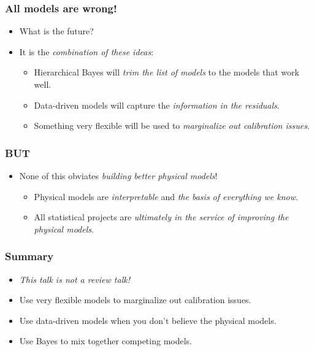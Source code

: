\documentclass[pdftex]{beamer}
\newcommand{\conclusions}{%
\begin{frame}
  \frametitle{Summary}
  \begin{itemize}
  \item \textit{This talk is not a review talk!}
  \item Use very flexible models to marginalize out calibration issues.
  \item Use data-driven models when you don't believe the physical models.
  \item Use Bayes to mix together competing models.
  \end{itemize}
\end{frame}}
\begin{document}
\begin{frame}
  \frametitle{All models are wrong!}
  \begin{itemize}
  \item What is the future?
  \item It is the \emph{combination of these ideas}:
    \begin{itemize}
    \item Hierarchical Bayes will \emph{trim the list of models} to the models that work well.
    \item Data-driven models will capture the \emph{information in the residuals}.
    \item Something very flexible will be used to \emph{marginalize out calibration issues}.
    \end{itemize}
  \end{itemize}
\end{frame}

\begin{frame}
  \frametitle{BUT}
  \begin{itemize}
  \item None of this obviates \emph{building better physical models}!
    \begin{itemize}
    \item Physical models are \emph{interpretable} and \emph{the basis
      of everything we know}.
    \item All statistical projects are \emph{ultimately in
      the service of improving the physical models}.
    \end{itemize}
  \end{itemize}
\end{frame}

\conclusions
\end{document}
